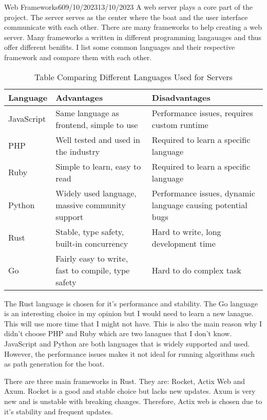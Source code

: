 \documentclass[12pt]{article}
\begin{document}
\begin{logbook-entry}{Web Frameworks}{6}{09/10/2023}{13/10/2023}
A web server plays a core part of the project.
The server serves as the center where the boat and the user interface communicate with each other.
There are many frameworks to help creating a web server.
Many frameworks a written in different programming langauages and thus offer different benifits.
I list some common languages and their respective framework and compare them with each other.

\begin{table}[H]
    \centering{}
    \caption{Table Comparing Different Languages Used for Servers}
    \begin{tabularx}{\textwidth}{l X X}
        \hline
        Language & Advantages & Disadvantages\\
        \hline
        JavaScript & Same language as frontend, simple to use & Performance issues, requires custom runtime\\
        PHP & Well tested and used in the industry & Required to learn a specific language\\
        Ruby & Simple to learn, easy to read & Required to learn a specific language\\
        Python & Widely used language, massive community support & Performance issues, dynamic language causing potential bugs\\
        Rust & Stable, type safety, built-in concurrency & Hard to write, long development time\\
        Go & Fairly easy to write, fast to compile, type safety & Hard to do complex task\\
        \hline
    \end{tabularx}
\end{table}

The Rust language is chosen for it's performance and stability.
The Go language is an interesting choice in my opinion but I would need to learn a new lanague.
This will use more time that I might not have.
This is also the main reason why I didn't choose PHP and Ruby which are two lanagues that I don't know.
JavaScript and Python are both languages that is widely supported and used.
However, the performance issues makes it not ideal for running algorithms such as path generation for the boat.

There are three main frameworks in Rust.
They are: Rocket, Actix Web and Axum.
Rocket is a good and stable choice but lacks new updates.
Axum is very new and is unstable with breaking changes.
Therefore, Actix web is chosen due to it's stability and frequent updates.
\end{logbook-entry}
\end{document}
